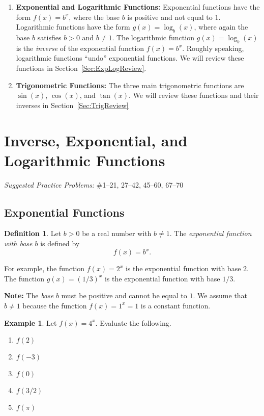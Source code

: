 \documentclass[letterpaper,12pt,oneside]{book}
\theoremstyle{definition}
\newtheorem{definition}[theorem]{Definition}
\newtheorem{example}[theorem]{Example}
\newcommand{\practicesection}[2]{%
    \section{#1}
    \textit{Suggested Practice Problems:} #2
    \smallskip%
}
\begin{document}
{\begin{enumerate}[label=\arabic*.]
\begin{enumerate}
\item \textbf{Exponential and Logarithmic Functions:} Exponential functions have the form $f(x)=b^x$, where the base $b$ is positive and not equal to $1$.  Logarithmic functions have the form $g(x)=\log_b(x)$, where again the base $b$ satisfies $b>0$ and $b\neq 1$.  The logarithmic function $g(x)=\log_b(x)$ is the \emph{inverse} of the exponential function $f(x)=b^x$.  Roughly speaking, logarithmic functions ``undo'' exponential functions.  We will review these functions in Section~\ref{Sec:ExpLogReview}.
\item \textbf{Trigonometric Functions:} The three main trigonometric functions are $\sin(x)$, $\cos(x)$, and $\tan(x)$.  We will review these functions and their inverses in Section~\ref{Sec:TrigReview}
\end{enumerate}
\end{enumerate}

\newpage

\practicesection{Inverse, Exponential, and Logarithmic Functions}{\#1--21, 27--42, 45--60, 67--70}

\label{Sec:ExpLogReview}

\subsection*{Exponential Functions}

\begin{definition}
Let $b>0$ be a real number with $b\neq 1$.  The \emph{exponential function with base $b$} is defined by
\[
f(x)=b^x.
\]
\end{definition}


\noindent
For example, the function $f(x)=2^x$ is the exponential function with base $2$.  The function $g(x)=(1/3)^x$ is the exponential function with base $1/3$.

\noindent
\textbf{Note:} The \emph{base} $b$ must be positive and cannot be equal to $1$.  We assume that $b\neq 1$ because the function $f(x)=1^x=1$ is a constant function. 

\begin{example}
Let $f(x)=4^x$.  Evaluate the following.
\begin{multicols}{2}
\begin{enumerate}
\item $f(2)$
\item $f(-3)$
\item $f(0)$
\item $f(3/2)$
\item $f(\pi)$
\end{enumerate}
\end{multicols}
\end{example}

}
\end{document}
